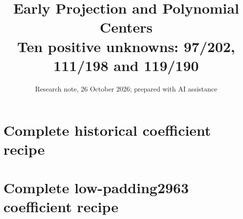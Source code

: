 \documentclass[10pt]{article}
\title{Early Projection and Polynomial Centers\\\large Ten positive unknowns: 97/202, 111/198 and 119/190}
\author{Research note, 26 October 2026; prepared with AI assistance}
\date{}
\begin{document}
\maketitle

\appendix
\setcounter{secnumdepth}{1}
\clearpage\section{Complete historical coefficient recipe}

\clearpage\section{Complete low-padding2963 coefficient recipe}

\end{document}
